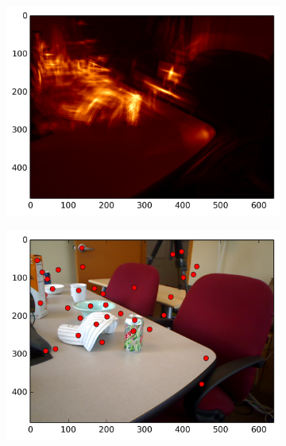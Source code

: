 \begin{figure}[ht]
\begin{subfigure}[]{0.25\linewidth}\label{fig:meet_smag_1}\includegraphics[width=\linewidth]{figures/meeting_smag_3}\end{subfigure}%
\begin{subfigure}[]{0.25\linewidth}\label{fig:meet_feats_1}\includegraphics[width=\linewidth]{figures/meeting_feats_3}\end{subfigure}\\

\end{figure}
